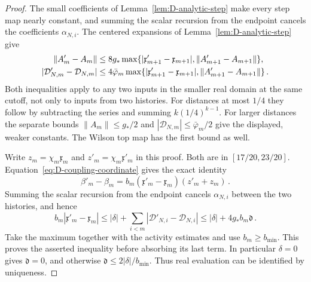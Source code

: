 \begin{proof}
The small coefficients of Lemma~\ref{lem:D-analytic-step} make every step map nearly constant, and summing the scalar recursion from the endpoint cancels the coefficients $\alpha_{N,i}$. The centered expansions of Lemma~\ref{lem:D-analytic-step} give
\begin{align}\label{eq:D-local-lipschitz}
\|A'_m-A_m\|&\le8g_*\max\{|\mathfrak x'_{m+1}-\mathfrak x_{m+1}|,\|A'_{m+1}-A_{m+1}\|\},\notag\\
|\mathcal D'_{N,m}-\mathcal D_{N,m}|&\le4\bar\varphi_m\max\{|\mathfrak x'_{m+1}-\mathfrak x_{m+1}|,\|A'_{m+1}-A_{m+1}\|\}\,.
\end{align}
Both inequalities apply to any two inputs in the smaller real domain at the same cutoff, not only to inputs from two histories. For distances at most $1/4$ they follow by subtracting the series and summing $k(1/4)^{k-1}$. For larger distances the separate bounds $\|A_m\|\le g_*/2$ and $|\mathcal D_{N,m}|\le \bar\varphi_m/2$ give the displayed, weaker constants. The Wilson top map has the first bound as well.

Write $z_m=\chi_m\mathfrak x_m$ and $z'_m=\chi_m\mathfrak x'_m$ in this proof. Both are in $[17/20,23/20]$. Equation~\eqref{eq:D-coupling-coordinate} gives the exact identity
\begin{equation*}
\beta'_m-\beta_m=b_m(\mathfrak x'_m-\mathfrak x_m)(z'_m+z_m)\,.
\end{equation*}
Summing the scalar recursion from the endpoint cancels $\alpha_{N,i}$ between the two histories, and hence
\begin{equation*}
b_m|\mathfrak x'_m-\mathfrak x_m|\le|\delta|+\sum_{i<m}|\mathcal D'_{N,i}-\mathcal D_{N,i}|
\le|\delta|+4g_*b_m \mathfrak d\,.
\end{equation*}
Take the maximum together with the activity estimates and use $b_m\ge b_{\min}$. This proves the asserted inequality before absorbing its last term. In particular $\delta=0$ gives $\mathfrak d=0$, and otherwise $\mathfrak d\le2|\delta|/b_{\min}$. Thus real evaluation can be identified by uniqueness.



\end{proof}
